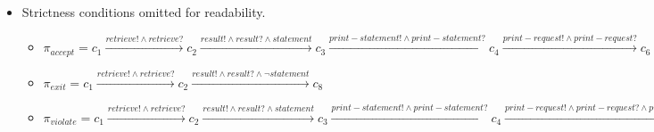 \documentclass{scrartcl}
\begin{document}
\begin{itemize}
		\item[(iii)] Strictness conditions omitted for readability.\\
			\begin{itemize}
			
		
			 \item[a)] $ \pi_{accept} = c_1 \xrightarrow{retrieve! \land retrieve?} c_2 \xrightarrow{result! \land result? \land statement} c_3 \xrightarrow{print-statement! \land print-statement?} c_4 \xrightarrow{print-request! \land print-request?} c_6 \xrightarrow{confirm! \land confirm?} c_7 \xrightarrow{main-menu! \land main-menu?} c_8$
			 
			 \item[b)] $ \pi_{exit} = c_1 \xrightarrow{retrieve! \land retrieve?} c_2 \xrightarrow{result! \land result? \land \neg statement} c_8 $ 
			 
			 \item[c)] $ \pi_{violate} = c_1 \xrightarrow{retrieve! \land retrieve?} c_2 \xrightarrow{result! \land result? \land statement} c_3 \xrightarrow{print-statement! \land print-statement?} c_4 \xrightarrow{print-request! \land print-request? \land print} illegal$
			\end{itemize}
	\end{itemize}
\end{document}
